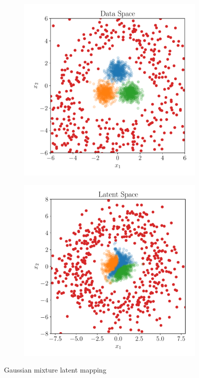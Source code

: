 \begin{figure}[htpb]
\begin{subfigure}[]{0.4\textwidth}
        \caption{}
        \label{fig:}
    \end{subfigure}
    \begin{subfigure}[]{0.4\textwidth}
        \centering
    \includegraphics[width=\linewidth]{figures/toy_example/gaussian_mixture/gumbel_samples.pdf}
        \caption{}
        \label{fig:}
    \end{subfigure}
    \begin{subfigure}[]{0.4\textwidth}
        \centering
    \includegraphics[width=\linewidth]{figures/toy_example/gaussian_mixture/latent_space_with_outliers.pdf}
        \caption{}
        \label{fig:}
    \end{subfigure}
    \caption{Gaussian mixture latent mapping}%
    \label{fig:latent_gmm}
\end{figure}

